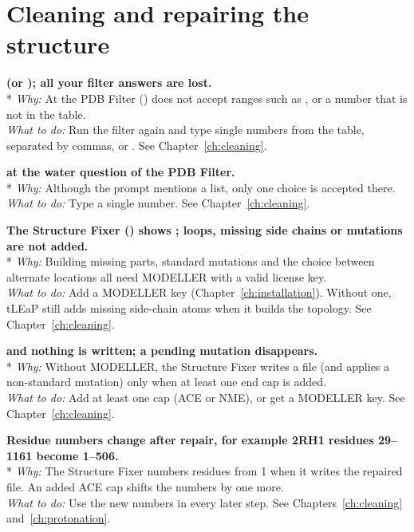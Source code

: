 \section{Cleaning and repairing the structure}\label{sec:troubleshooting-cleaning}

{\bfseries {} (or ); all your filter answers are lost.}\\*
\emph{Why:} At  the PDB Filter () does not
accept ranges such as , or a number that is not in the table.\\
\emph{What to do:} Run the filter again and type single numbers from the
table, separated by commas, or . See Chapter~\ref{ch:cleaning}.

{\bfseries {}
at the water question of the PDB Filter.}\\*
\emph{Why:} Although the prompt mentions a list, only one choice is accepted
there.\\
\emph{What to do:} Type a single number. See Chapter~\ref{ch:cleaning}.

{\bfseries The Structure Fixer () shows ; loops, missing side chains or mutations are not added.}\\*
\emph{Why:} Building missing parts, standard mutations and the choice between
alternate locations all need MODELLER with a valid license key.\\
\emph{What to do:} Add a MODELLER key (Chapter~\ref{ch:installation}).
Without one, tLEaP still adds missing side-chain atoms when it builds the
topology. See Chapter~\ref{ch:cleaning}.

{\bfseries {} and nothing is written; a
pending mutation disappears.}\\*
\emph{Why:} Without MODELLER, the Structure Fixer writes a file (and applies a
non-standard mutation) only when at least one end cap is added.\\
\emph{What to do:} Add at least one cap (ACE or NME), or get a MODELLER key.
See Chapter~\ref{ch:cleaning}.

{\bfseries Residue numbers change after repair, for example 2RH1 residues
29--1161 become 1--506.}\\*
\emph{Why:} The Structure Fixer numbers residues from 1 when it writes the
repaired file. An added ACE cap shifts the numbers by one more.\\
\emph{What to do:} Use the new numbers in every later step. See
Chapters~\ref{ch:cleaning} and~\ref{ch:protonation}.

